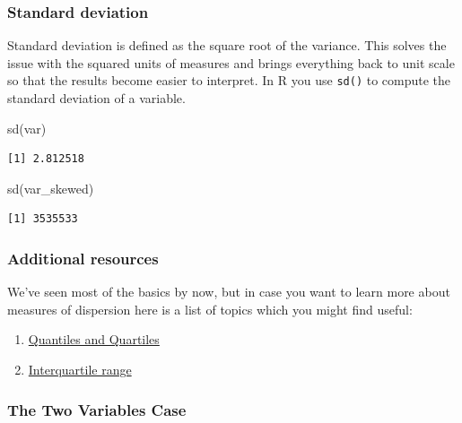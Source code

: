 \documentclass[
  letterpaper,
  DIV=11,
  numbers=noendperiod]{scrartcl}
\newenvironment{Shaded}{\begin{snugshade}}{\end{snugshade}}
\newcommand{\FunctionTok}[1]{\textcolor[rgb]{0.28,0.35,0.67}{#1}}
\newcommand{\NormalTok}[1]{\textcolor[rgb]{0.00,0.23,0.31}{#1}}
\providecommand{\tightlist}{%
  \setlength{\itemsep}{0pt}\setlength{\parskip}{0pt}}\usepackage{longtable,booktabs,array}
\begin{document}
\subsubsection{Standard deviation}\label{standard-deviation}

Standard deviation is defined as the square root of the variance. This
solves the issue with the squared units of measures and brings
everything back to unit scale so that the results become easier to
interpret. In R you use \texttt{sd()} to compute the standard deviation
of a variable.

\begin{Shaded}
\begin{Highlighting}[]
\FunctionTok{sd}\NormalTok{(var)}
\end{Highlighting}
\end{Shaded}

\begin{verbatim}
[1] 2.812518
\end{verbatim}

\begin{Shaded}
\begin{Highlighting}[]
\FunctionTok{sd}\NormalTok{(var\_skewed)}
\end{Highlighting}
\end{Shaded}

\begin{verbatim}
[1] 3535533
\end{verbatim}

\subsubsection{Additional resources}\label{additional-resources}

We've seen most of the basics by now, but in case you want to learn more
about measures of dispersion here is a list of topics which you might
find useful:

\begin{enumerate}
\def\labelenumi{\arabic{enumi}.}
\tightlist
\item
  \href{https://www.scribbr.com/statistics/quartiles-quantiles/\#:~:text=A\%20quartile\%20is\%20a\%20type,sorted\%20data\%20into\%20q\%20parts.}{Quantiles
  and Quartiles}
\item
  \href{https://en.wikipedia.org/wiki/Interquartile_range}{Interquartile
  range}
\end{enumerate}

\subsubsection{The Two Variables Case}\label{the-two-variables-case}
\end{document}
